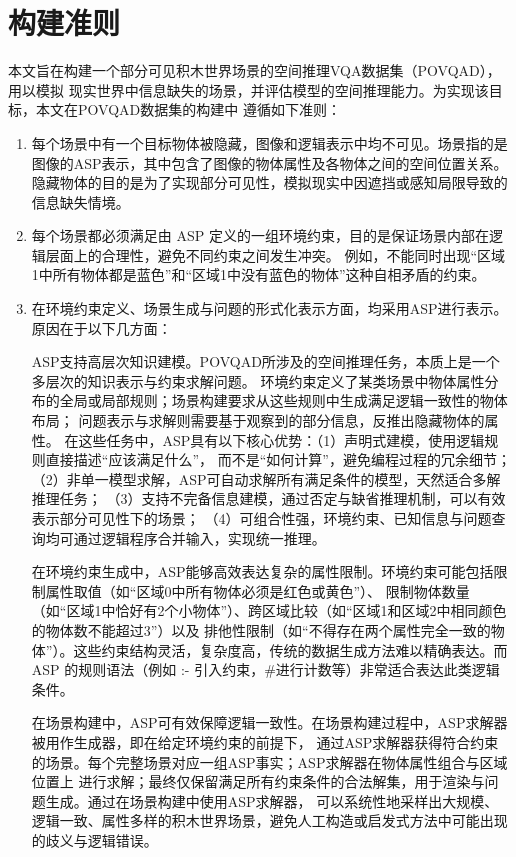 \section{构建准则}
本文旨在构建一个部分可见积木世界场景的空间推理VQA数据集（POVQAD），用以模拟
现实世界中信息缺失的场景，并评估模型的空间推理能力。为实现该目标，本文在POVQAD数据集的构建中
遵循如下准则：
\begin{enumerate}[nosep]
\item 每个场景中有一个目标物体被隐藏，图像和逻辑表示中均不可见。场景指的是图像的ASP表示，其中包含了图像的物体属性及各物体之间的空间位置关系。
隐藏物体的目的是为了实现部分可见性，模拟现实中因遮挡或感知局限导致的信息缺失情境。
\item 每个场景都必须满足由 ASP 定义的一组环境约束，目的是保证场景内部在逻辑层面上的合理性，避免不同约束之间发生冲突。
例如，不能同时出现“区域1中所有物体都是蓝色”和“区域1中没有蓝色的物体”这种自相矛盾的约束。
\item 在环境约束定义、场景生成与问题的形式化表示方面，均采用ASP进行表示。原因在于以下几方面：

ASP支持高层次知识建模。POVQAD所涉及的空间推理任务，本质上是一个多层次的知识表示与约束求解问题。
环境约束定义了某类场景中物体属性分布的全局或局部规则；场景构建要求从这些规则中生成满足逻辑一致性的物体布局；
问题表示与求解则需要基于观察到的部分信息，反推出隐藏物体的属性。
在这些任务中，ASP具有以下核心优势：（1）声明式建模，使用逻辑规则直接描述“应该满足什么”，
而不是“如何计算”，避免编程过程的冗余细节；（2）非单一模型求解，ASP可自动求解所有满足条件的模型，天然适合多解推理任务；
（3）支持不完备信息建模，通过否定与缺省推理机制，可以有效表示部分可见性下的场景；
（4）可组合性强，环境约束、已知信息与问题查询均可通过逻辑程序合并输入，实现统一推理。

在环境约束生成中，ASP能够高效表达复杂的属性限制。环境约束可能包括限制属性取值（如“区域0中所有物体必须是红色或黄色”）、
限制物体数量（如“区域1中恰好有2个小物体”）、跨区域比较（如“区域1和区域2中相同颜色的物体数不能超过3”）以及
排他性限制（如“不得存在两个属性完全一致的物体”）。这些约束结构灵活，复杂度高，传统的数据生成方法难以精确表达。而 ASP 的规则语法（例如 :- 引入约束，\#进行计数等）非常适合表达此类逻辑条件。

在场景构建中，ASP可有效保障逻辑一致性。在场景构建过程中，ASP求解器被用作生成器，即在给定环境约束的前提下，
通过ASP求解器获得符合约束的场景。每个完整场景对应一组ASP事实；ASP求解器在物体属性组合与区域位置上
进行求解；最终仅保留满足所有约束条件的合法解集，用于渲染与问题生成。通过在场景构建中使用ASP求解器，
可以系统性地采样出大规模、逻辑一致、属性多样的积木世界场景，避免人工构造或启发式方法中可能出现的歧义与逻辑错误。


\end{enumerate}
